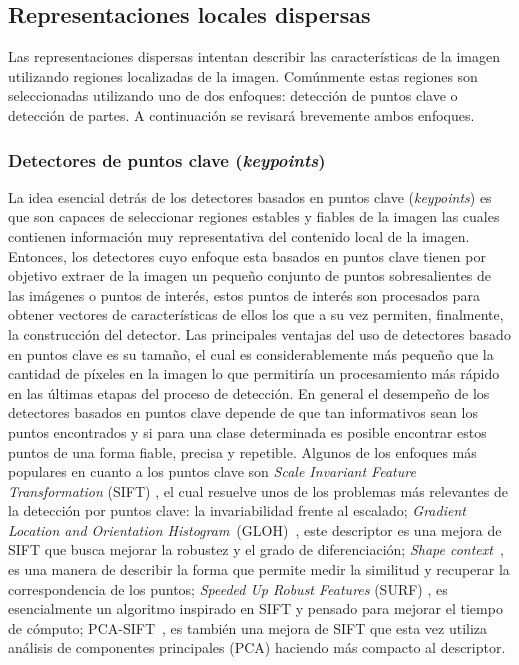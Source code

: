 \subsection{Representaciones locales dispersas}
\label{caract:dispersas}

Las representaciones dispersas intentan describir las características de la imagen utilizando regiones localizadas de la imagen. Comúnmente estas regiones son seleccionadas utilizando uno de dos enfoques: detección de puntos clave o detección de partes. A continuación se revisará brevemente ambos enfoques.

\subsubsection{Detectores de puntos clave (\textit{keypoints})}

La idea esencial detrás de los detectores basados en puntos clave (\textit{keypoints}) es que son capaces de seleccionar regiones estables y fiables de la imagen las cuales contienen información muy representativa del contenido local de la imagen. Entonces, los detectores cuyo enfoque esta basados en puntos clave tienen por objetivo extraer de la imagen un pequeño conjunto de puntos sobresalientes de las imágenes o puntos de interés, estos puntos de interés son procesados para obtener vectores de características de ellos los que a su vez permiten, finalmente, la construcción del detector. Las principales ventajas del uso de detectores basado en puntos clave es su tamaño, el cual es considerablemente más pequeño que la cantidad de píxeles en la imagen lo que permitiría un procesamiento más rápido en las últimas etapas del proceso de detección. En general el desempeño de los detectores basados en puntos clave depende de que tan informativos sean los puntos encontrados y si para una clase determinada es posible encontrar estos puntos de una forma fiable, precisa y repetible. Algunos de los enfoques más populares \citep{gupta2008} en cuanto a los puntos clave son \textit{Scale Invariant Feature Transformation} (SIFT) \citep{Lowe2004}, el cual resuelve unos de los problemas más relevantes de la detección por puntos clave: la invariabilidad frente al escalado; \textit{Gradient Location and Orientation Histogram}~(GLOH)~\citep{Mikolajczyk2005}, este descriptor es una mejora de SIFT que busca mejorar la robustez y el grado de diferenciación; \textit{Shape context}~\citep{Belongie2002}, es una manera de describir la forma que permite medir la similitud y recuperar la correspondencia de los puntos; \textit{Speeded Up Robust Features} (SURF) \citep{Bay2006}, es esencialmente un algoritmo inspirado en SIFT y pensado para mejorar el tiempo de cómputo; PCA-SIFT~\citep{Ke2004}, es también una mejora de SIFT que esta vez utiliza análisis de componentes principales (PCA) haciendo más compacto al descriptor.

